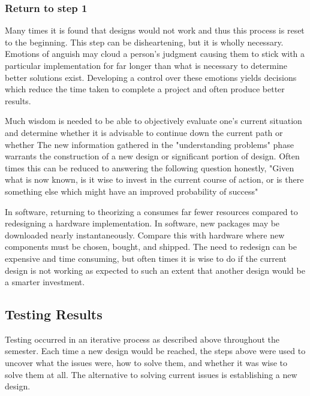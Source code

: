 \documentclass{article}	%
\begin{document}
\begin{multicols}{2}
\subsubsection{Return to step 1}
Many times it is found that designs would not work
and thus this process is reset to the beginning.
This step can be disheartening, but
it is wholly necessary.
Emotions of anguish may cloud a person's judgment
causing them to stick with a particular implementation
for far longer than what is necessary to determine 
better solutions exist.
Developing a control over these emotions
yields decisions which reduce the time
taken to complete a project and
often produce better results.

Much wisdom is needed to be able to objectively 
evaluate one's current situation and determine 
whether it is advisable to
continue down the current path or whether
The new information gathered in the "understanding problems" phase
warrants the construction of a new design 
or significant portion of design.
Often times this can be reduced to answering the following question honestly,
"Given what is now known,
is it wise to invest in the current course of action, or
is there something else which might have an improved probability of success"

In software,
returning to theorizing a consumes far fewer resources compared
to redesigning a hardware implementation.
In software,
new packages may be downloaded nearly instantaneously.
Compare this with hardware where new components must
be chosen, bought, and shipped.
The need to redesign can be expensive and time consuming, but
often times it is wise to do if the current design is not working as expected
to such an extent that another design would be a smarter investment.

\subsection{Testing Results}
Testing occurred in an iterative process
as described above throughout the semester.
Each time a new design would be reached,
the steps above were used to uncover what
the issues were, 
how to solve them, and
whether it was wise to solve them at all.
The alternative to solving current issues is
establishing a new design.


\end{multicols}
\end{document}
